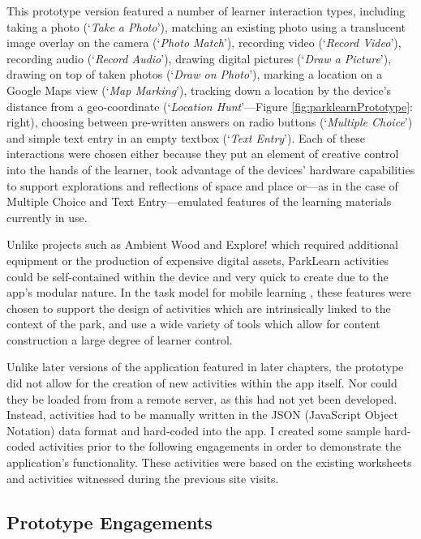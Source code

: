 This prototype version featured a number of learner interaction types, including taking a photo (`\textit{Take a Photo}'), matching an existing photo using a translucent image overlay on the camera (`\textit{Photo Match}'), recording video (`\textit{Record Video}'), recording audio (`\textit{Record Audio}'), drawing digital pictures (`\textit{Draw a Picture}'), drawing on top of taken photos (`\textit{Draw on Photo}'), marking a location on a Google Maps view (`\textit{Map Marking}'), tracking down a location by the device’s distance from a geo-coordinate (`\textit{Location Hunt}'---Figure \ref{fig:parklearnPrototype}: right), choosing between pre-written answers on radio buttons (`\textit{Multiple Choice}') and simple text entry in an empty textbox (`\textit{Text Entry}'). Each of these interactions were chosen either because they put an element of creative control into the hands of the learner, took advantage of the devices’ hardware capabilities to support explorations and reflections of space and place or---as in the case of Multiple Choice and Text Entry---emulated features of the learning materials currently in use. 

Unlike projects such as Ambient Wood \citep{Rogers2004} and Explore! \citep{Costabile2008} which required additional equipment or the production of expensive digital assets, ParkLearn activities could be self-contained within the device and very quick to create due to the app’s modular nature. In the task model for mobile learning \citep{Sharples2013}, these features were chosen to support the design of activities which are intrinsically linked to the context of the park, and use a wide variety of tools which allow for content construction a large degree of learner control.

Unlike later versions of the application featured in later chapters, the prototype did not allow for the creation of new activities within the app itself. Nor could they be loaded from from a remote server, as this had not yet been developed. Instead, activities had to be manually written in the JSON (JavaScript Object Notation) data format and hard-coded into the app. I created some sample hard-coded activities prior to the following engagements in order to demonstrate the application's functionality. These activities were based on the existing worksheets and activities witnessed during the previous site visits.

\subsection{Prototype Engagements}

